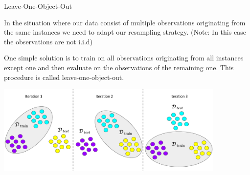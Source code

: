 \begin{vbframe}{Leave-One-Object-Out}

In the situation where our data consist of multiple observations 
originating from the same instances we need to adapt our resampling strategy. 
(Note: In this case the observations are not i.i.d)

\lz

One simple solution is to train on all observations originating from all instances
except one and then evaluate on the observations of the remaining one. This
procedure is called leave-one-object-out.
\lz

\begin{knitrout}\scriptsize
{}\color{fgcolor}

{\centering \includegraphics[width=0.85\textwidth]{figure_man/loobject} 

}

\end{knitrout}
\end{vbframe}
\endlecture

